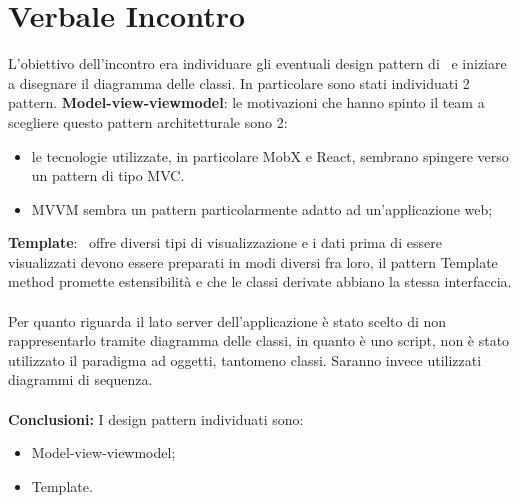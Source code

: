 \section{Verbale Incontro}
L'obiettivo dell'incontro era individuare gli eventuali design pattern di \hd\ e iniziare a disegnare il diagramma delle classi. In particolare sono stati individuati 2 pattern.
\textbf{Model-view-viewmodel}: le motivazioni che hanno spinto il team a scegliere questo pattern architetturale sono 2:
\begin{itemize}
    \item le tecnologie utilizzate, in particolare MobX e React, sembrano spingere verso un pattern di tipo MVC.
    \item MVVM sembra un pattern particolarmente adatto ad un'applicazione web;
\end{itemize}
\noindent \textbf{Template}: \hd\ offre diversi tipi di visualizzazione e i dati prima di essere visualizzati devono essere preparati in modi diversi fra loro, il pattern Template method promette estensibilità e che le classi derivate abbiano la stessa interfaccia.
\\ \\
\noindent Per quanto riguarda il lato server dell'applicazione è stato scelto di non rappresentarlo tramite diagramma delle classi, in quanto è uno script, non è stato utilizzato il paradigma ad oggetti, tantomeno classi. Saranno invece utilizzati diagrammi di sequenza.
\\ \\
\noindent\textbf{Conclusioni:}
I design pattern individuati sono:
\begin{itemize}
    \item Model-view-viewmodel;
    \item Template.
\end{itemize}